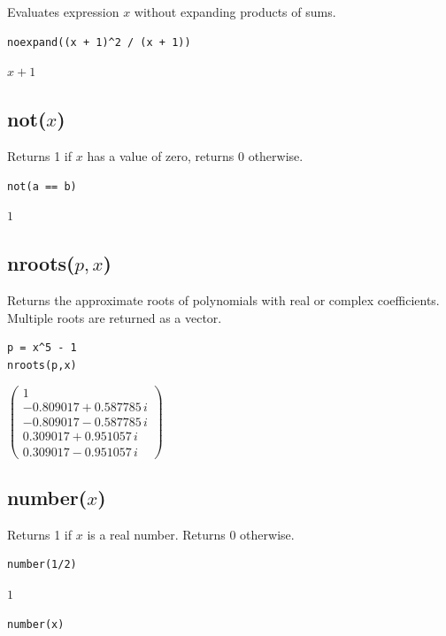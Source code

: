 \documentclass[12pt]{article}
\begin{document}
Evaluates expression $x$ without expanding products of sums.

{\color{blue}
\begin{verbatim}
noexpand((x + 1)^2 / (x + 1))
\end{verbatim}
}

$x + 1$

\subsection*{not($x$)}

Returns 1 if $x$ has a value of zero, returns 0 otherwise.

{\color{blue}
\begin{verbatim}
not(a == b)
\end{verbatim}
}

$1$

\subsection*{nroots($p,x$)}

Returns the approximate roots of polynomials with real or complex coefficients.
Multiple roots are returned as a vector.

{\color{blue}
\begin{verbatim}
p = x^5 - 1
nroots(p,x)
\end{verbatim}
}

$\displaystyle
\begin{pmatrix}
1
\\[1ex]
-0.809017 + 0.587785\,i
\\[1ex]
-0.809017 - 0.587785\,i
\\[1ex]
0.309017 + 0.951057\,i
\\[1ex]
0.309017 - 0.951057\,i
\end{pmatrix}
$

\subsection*{number($x$)}

Returns 1 if $x$ is a real number.
Returns 0 otherwise.

{\color{blue}
\begin{verbatim}
number(1/2)
\end{verbatim}
}

$1$

{\color{blue}
\begin{verbatim}
number(x)
\end{verbatim}
}
\end{document}
